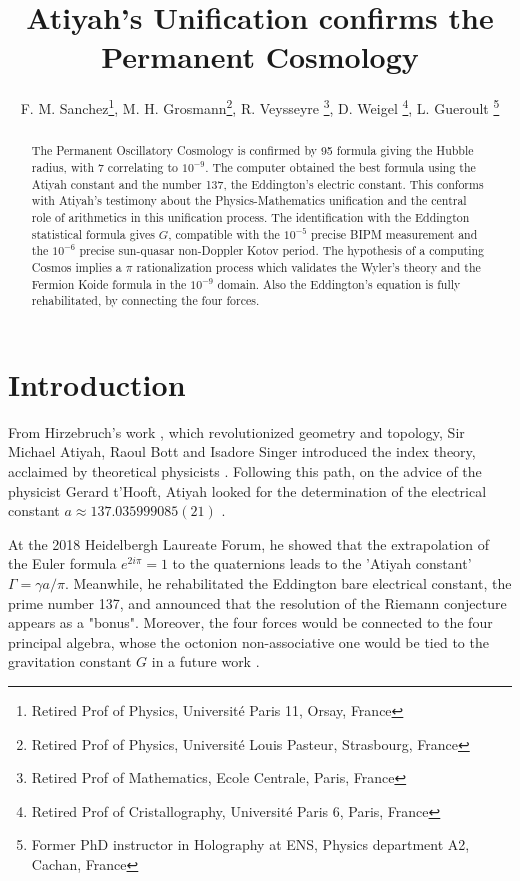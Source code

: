 \documentclass[a4paper,9pt]{article}
\title{Atiyah's Unification confirms the Permanent Cosmology}
\author{F. M. Sanchez\thanks{Retired Prof of Physics, Universit\'{e} Paris 11, Orsay, France}, M. H. Grosmann\thanks{Retired Prof of Physics, Universit\'{e} Louis Pasteur, Strasbourg, France}, R. Veysseyre \thanks{Retired Prof of Mathematics, Ecole Centrale, Paris, France}, D. Weigel \thanks{Retired Prof of Cristallography, Universit\'{e} Paris 6, Paris, France}, L. Gueroult \thanks{Former PhD instructor in Holography at ENS, Physics department A2, Cachan, France}}
\begin{document}
\setcounter{page}{1}

\maketitle

\begin{abstract}
The Permanent Oscillatory Cosmology is confirmed by 95 formula giving the Hubble radius, with 7 correlating to $10^{-9}$. The computer obtained the best formula using the Atiyah constant and the number 137, the Eddington's electric constant. This conforms with Atiyah's testimony about the Physics-Mathematics unification and the central role of arithmetics in this unification process. The identification with the Eddington statistical formula gives $G$, compatible with the $10^{-5}$ precise BIPM measurement and the $10^{-6}$ precise sun-quasar non-Doppler Kotov period. The hypothesis of a computing Cosmos implies a $\pi$ rationalization process which validates the Wyler's theory and the Fermion Koide formula in the $10^{-9}$ domain. Also the Eddington's equation is fully rehabilitated, by connecting the four forces.  
\end{abstract}





\label{sec:headings}

\section{Introduction}
  
    From Hirzebruch's work \cite{Hirzebruch}, which revolutionized geometry and topology, Sir Michael Atiyah, Raoul Bott \cite{Bott} and Isadore Singer \cite{Singer} introduced the index theory, acclaimed by theoretical physicists \cite{Alvarez}. Following this path, on the advice of the physicist Gerard t'Hooft, Atiyah looked for the determination of the electrical constant $a \approx 137.035999085(21)$ \cite{Atiyah}.
    
    
    At the 2018 Heidelbergh Laureate Forum, he showed that the extrapolation of the Euler formula  $e^{2i\pi} = 1$ to the quaternions leads to the 'Atiyah constant' $\Gamma = \gamma a/\pi $. Meanwhile, he rehabilitated the Eddington \cite{Eddington} bare electrical constant, the prime number 137, and announced that the resolution of the Riemann conjecture appears as a "bonus". Moreover, the four forces would be connected to the four principal algebra, whose the octonion non-associative one would be tied to the gravitation constant $G$ in a future work \cite{Atiyah}. 
       
\end{document}
